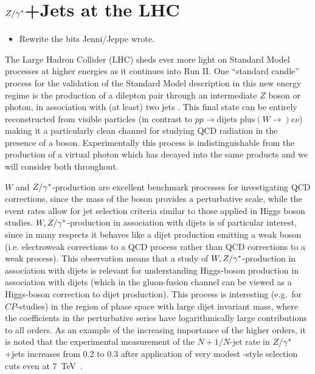 \chapter{$Z/\gamma^*$+Jets at the LHC}
\label{chap:Zs}

	\begin{itemize}
		\item Rewrite the bits Jenni/Jeppe wrote.
	\end{itemize}

	The Large Hadron Collider (LHC) sheds ever more light on Standard Model
	processes at higher energies as it continues into Run II.  One
	``standard candle'' process for the validation of  the
	Standard Model description in this new energy regime is the production of a
	dilepton pair through an intermediate $Z$ boson or photon, in
	association with (at least) two jets
	\cite{Chatrchyan:2011ne, Aad:2011qv,
	  Chatrchyan:2013tna, Aad:2013ysa, Khachatryan:2014zya, Aad:2014rta,
	  Khachatryan:2014dea}.  This final state can be entirely reconstructed from
	visible particles (in contrast to $pp\to \text{dijets plus}(W\to) e\nu$) making it a particularly
	clean channel for studying QCD radiation in the presence of a boson.
	Experimentally this process is indistinguishable from the production of a
	virtual photon which has decayed into the same products and we will consider
	both throughout.

	$W$ and $Z/\gamma^*$-production are excellent benchmark processes for investigating
	QCD corrections, since the mass of the boson provides a perturbative scale,
	while the event rates allow for jet selection criteria similar to those
	applied in Higgs boson studies. $W,Z/\gamma^*$-production in association with dijets
	is of particular interest, since in many respects it behaves like a dijet
	production emitting a weak boson (i.e. electroweak corrections to a QCD
	process rather than QCD corrections to a weak process). This observation
	means that a study of $W,Z/\gamma^*$-production in association with dijets is
	relevant for understanding Higgs-boson production in association with dijets
	(which in the gluon-fusion channel can be viewed as a Higgs-boson correction
	to dijet production). This process is interesting (e.g.~for $CP$-studies) in
	the region of phase space with large dijet invariant mass, where the
	coefficients in the perturbative series have logarithmically large
	contributions to all orders. As an example of the increasing importance of
	the higher orders, it is noted that the experimental measurement of the
	$N+1/N$-jet rate in $Z/\gamma^*$+jets increases from 0.2 to 0.3 after application of
	very modest \wbf-style selection cuts even at 7~TeV~\cite{Chatrchyan:2011ne,Aad:2011qv,Aad:2013ysa}.

